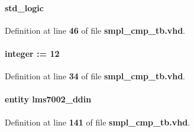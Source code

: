 \paragraph[{inst0\+\_\+fsync}]{ {\bfseries \textcolor{comment}{std\+\_\+logic}\textcolor{vhdlchar}{ }} \hspace{0.3cm}{\ttfamily [Signal]}}\label{classsmpl__cmp__tb_1_1tb__behave_a4a92f2c44f63032a7b0d3743309deafd}


Definition at line {\bf 46} of file {\bf smpl\+\_\+cmp\+\_\+tb.\+vhd}.

\paragraph[{iq\+\_\+width}]{ {\bfseries \textcolor{comment}{integer}\textcolor{vhdlchar}{ }\textcolor{vhdlchar}{ }\textcolor{vhdlchar}{\+:}\textcolor{vhdlchar}{=}\textcolor{vhdlchar}{ }\textcolor{vhdlchar}{ } \textcolor{vhdldigit}{12} \textcolor{vhdlchar}{ }} \hspace{0.3cm}{\ttfamily [Signal]}}\label{classsmpl__cmp__tb_1_1tb__behave_a62a21385fa329345032e7cc872b5b52e}


Definition at line {\bf 34} of file {\bf smpl\+\_\+cmp\+\_\+tb.\+vhd}.

\paragraph[{lms7002\+\_\+ddin\+\_\+dut1}]{ {\bfseries \textcolor{keywordflow}{entity}\textcolor{vhdlchar}{ }\textcolor{vhdlchar}{lms7002\+\_\+ddin}\textcolor{vhdlchar}{ }} \hspace{0.3cm}{\ttfamily [Instantiation]}}\label{classsmpl__cmp__tb_1_1tb__behave_a65725219cec82c6e75efc468a9421633}


Definition at line {\bf 141} of file {\bf smpl\+\_\+cmp\+\_\+tb.\+vhd}.

